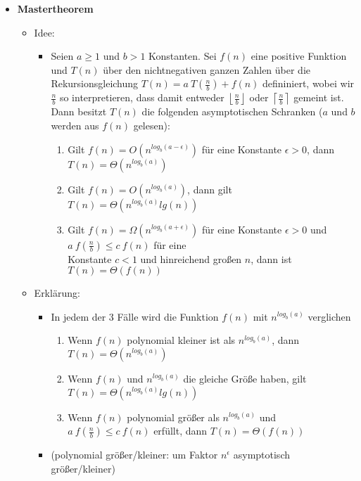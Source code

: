 \begin{itemize}
        \item \textbf{Mastertheorem}
            \begin{itemize}
                \item Idee:
                    \begin{itemize}
                        \item[] 
                            Seien $a \geq 1$ und $b > 1$ Konstanten. Sei $f(n)$ eine positive Funktion und $T(n)$ 
                            über den nichtnegativen ganzen Zahlen über die Rekursionsgleichung $T(n) = a~T(\frac{n}{b}) + f(n)$
                            defininiert, wobei wir $\frac{n}{b}$ so interpretieren, dass damit entweder $\left \lfloor \frac{n}{b} \right \rfloor$
                            oder $\left \lceil \frac{n}{b} \right \rceil$ gemeint ist. Dann besitzt $T(n)$ die folgenden asymptotischen Schranken
                            ($a$ und $b$ werden aus $f(n)$ gelesen):
                            \begin{enumerate}
                                \item Gilt $f(n) = O(n^{log_b (a - \epsilon)})$ für eine Konstante $\epsilon > 0$, dann $T(n) = \Theta(n^{log_b (a)})$
                                \item Gilt $f(n) = O(n^{log_b (a)})$, dann gilt $T(n) = \Theta(n^{log_b (a)} lg(n))$
                                \item Gilt $f(n) = \Omega(n^{log_b (a+\epsilon)})$ für eine Konstante $\epsilon > 0$ und $a~f(\frac{n}{b}) \leq c~f(n)$
                                      für eine \\ Konstante $c < 1$ und hinreichend großen $n$, dann ist $T(n) = \Theta(f(n))$
                            \end{enumerate}
                    \end{itemize}
                
                \item Erklärung:
                    \begin{itemize}
                        \item In jedem der 3 Fälle wird die Funktion $f(n)$ mit $n^{log_b(a)}$ verglichen
                            \begin{enumerate}
                                \item Wenn $f(n)$ polynomial kleiner ist als $n^{log_b(a)}$, dann $T(n) = \Theta(n^{log_b(a)})$
                                \item Wenn $f(n)$ und $n^{log_b(a)}$ die gleiche Größe haben, gilt $T(n) = \Theta(n^{log_b (a)} lg(n))$
                                \item Wenn $f(n)$ polynomial größer als $n^{log_b(a)}$ und $a~f(\frac{n}{b}) \leq c~f(n)$ erfüllt, dann $T(n) = \Theta(f(n))$
                            \end{enumerate}
                        \item (polynomial größer/kleiner: um Faktor $n^\epsilon$ asymptotisch größer/kleiner)
                    \end{itemize}


\end{itemize}
\end{itemize}

